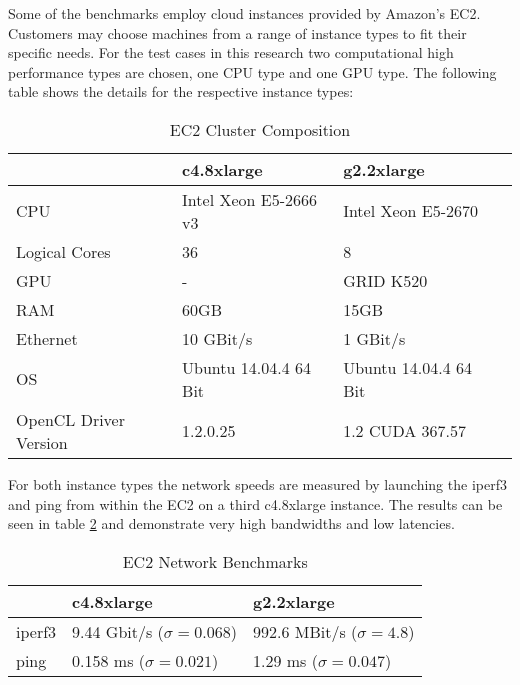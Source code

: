 Some of the benchmarks employ cloud instances provided by Amazon's EC2. Customers may choose machines from a range of instance types to fit their specific needs. For the test cases in this research two computational high performance types are chosen, one CPU type and one GPU type. The following table shows the details for the respective instance types:

\begin{table}[!htb]
	\centering
	\begin{adjustbox}{width=0.65\textwidth}
		\small
		\begin{tabular}{l | l | l | l}
			~                     & c4.8xlarge                	& g2.2xlarge                 \\
			\hline
			CPU                   &  Intel Xeon E5-2666 v3 	& Intel Xeon E5-2670 \\
			Logical Cores         &  36 	& 8 \\
			GPU                   &  -						& GRID K520 \\
			RAM                   &  60GB                       	& 15GB                       \\
			Ethernet          &  10 GBit/s                  	& 1 GBit/s                  \\
			OS                    &  Ubuntu 14.04.4 64 Bit      	& Ubuntu 14.04.4 64 Bit      \\
			OpenCL Driver Version &  1.2.0.25                   & 1.2 CUDA 367.57        \\
		\end{tabular}
	\end{adjustbox}
	
	\caption{EC2 Cluster Composition}
	\label{table:cluster_setup_ec2}
\end{table}

For both instance types the network speeds are measured by launching the iperf3 and ping from within the EC2 on a third c4.8xlarge instance. The results can be seen in table \ref{table:cluster_interconnect_benchmarks} and demonstrate very high bandwidths and low latencies.

\begin{table}[!htb]
	\centering
	\begin{adjustbox}{width=0.5\textwidth}
		\small
		\begin{tabular}{l | l | l}
			~                     & c4.8xlarge               			& g2.2xlarge                \\
			\hline
			iperf3                & 9.44 Gbit/s ($\sigma = 0.068$) 	& 992.6 MBit/s ($\sigma = 4.8$) \\
			ping                  & 0.158 ms ($\sigma = 0.021$)  		& 1.29 ms ($\sigma = 0.047$)  \\
		\end{tabular}
	\end{adjustbox}
	
	\caption{EC2 Network Benchmarks}
	\label{table:cluster_interconnect_benchmarks}
\end{table}


